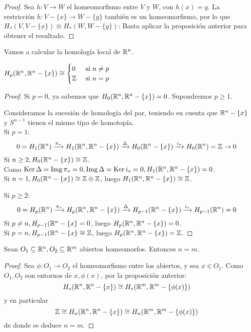 \begin{proof}
  Sea $h \colon V \to W$ el homeomorfismo entre $V$ y $W$, con $h(x) = y$. La restricción $h \colon V - \{x\} \to W - \{y\}$ también es un homeomorfismo,
  por lo que $H_*(V, V - \{x\}) \cong H_*(W, W - \{y\})$: Basta aplicar la proposición anterior para obtener el resultado.
\end{proof}

Vamos a calcular la homología local de $\mathbb{R}^n$.

\begin{proposition}
  $H_p(\mathbb{R}^n, \mathbb{R}^n - \{x\}) \cong \begin{cases} 0 &\text{ si } n \neq p \\ \mathbb{Z} &\text{ si } n = p \end{cases}$
\end{proposition}

\begin{proof}
  Si $p = 0$, ya sabemos que $H_0(\mathbb{R}^n, \mathbb{R}^n - \{x\}) = 0$. Supondremos $p \geq 1$.

  Consideramos la sucesión de homología del par, teniendo en cuenta que $\mathbb{R}^n - \{x\}$ y $S^{n-1}$ tienen el mismo tipo de homotopía. \\
  Si $p = 1$:
  \[ 0 = H_1(\mathbb{R}^n) \xrightarrow{\pi_*} H_1(\mathbb{R}^n, \mathbb{R}^n - \{x\}) \xrightarrow{\Delta} H_0(\mathbb{R}^n - \{x\}) \xrightarrow{i_*} H_0(\mathbb{R}^n) = \mathbb{Z} \to 0 \]
  Si $n \geq 2, H_0(\mathbb{R}^n - \{x\}) \cong \mathbb{Z}$. \\
  Como $\operatorname{Ker} \Delta = \operatorname{Img} \pi_* = 0, \operatorname{Img} \Delta = \operatorname{Ker} i_* = 0, H_1(\mathbb{R}^n, \mathbb{R}^n - \{x\}) = 0$. \\
  Si $n = 1, H_0(\mathbb{R}^n - \{x\}) \cong \mathbb{Z} \oplus \mathbb{Z}$, luego $H_1(\mathbb{R}^n, \mathbb{R}^n - \{x\}) \cong \mathbb{Z}$.

  Si $p \geq 2$:
  \[ 0 = H_p(\mathbb{R}^n) \xrightarrow{\pi_*} H_p(\mathbb{R}^n, \mathbb{R}^n - \{x\}) \xrightarrow{\Delta} H_{p-1}(\mathbb{R}^n - \{x\}) \xrightarrow{i_*} H_{p-1}(\mathbb{R}^n) = 0 \]
  Si $p \neq n, H_{p-1}(\mathbb{R}^n - \{x\} = 0$, luego $H_p(\mathbb{R}^n, \mathbb{R}^n - \{x\}) = 0$. \\
  Si $p = n, H_{p-1}(\mathbb{R}^n - \{x\} \cong \mathbb{Z}$, luego  $H_p(\mathbb{R}^n, \mathbb{R}^n - \{x\}) = \mathbb{Z}$.
\end{proof}

\begin{theorem}
  Sean $O_1 \subseteq \mathbb{R}^n, O_2 \subseteq \mathbb{R}^m$ abiertos homeomorfos. Entonces $n = m$.
\end{theorem}

\begin{proof}
  Sea $\phi \colon O_1 \to O_2$ el homeomorfismo entre los abiertos, y sea $x \in O_1$. Como $O_1, O_2$ son entornos de $x, \phi(x)$,
  por la proposición anterior:
  \[H_*(\mathbb{R}^n, \mathbb{R}^n - \{x\}) \cong H_*(\mathbb{R}^m, \mathbb{R}^m - \{\phi(x)\}) \]
  y en particular
  \[ \mathbb{Z} \cong H_n(\mathbb{R}^n, \mathbb{R}^n - \{x\}) \cong H_n(\mathbb{R}^m, \mathbb{R}^m - \{\phi(x)\}) \]
  de donde se deduce $n = m$.
\end{proof}

